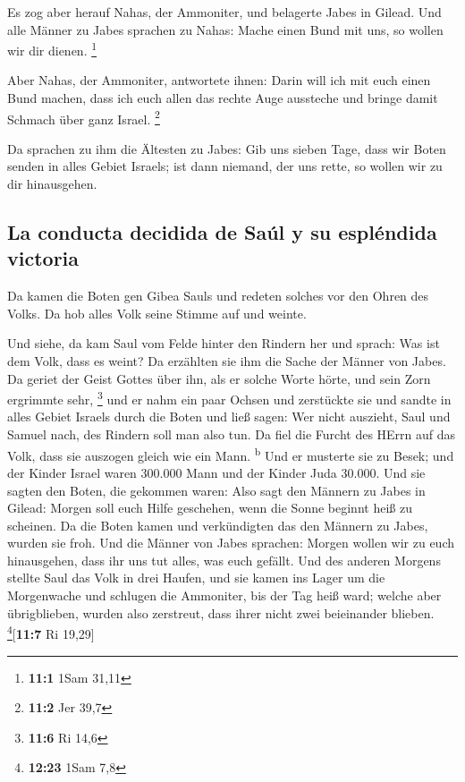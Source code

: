  Es zog aber herauf Nahas, der Ammoniter, und belagerte
Jabes in Gilead. Und alle Männer zu Jabes sprachen zu Nahas: Mache einen
Bund mit uns, so wollen wir dir dienen. \footnote{\textbf{11:1} 1Sam
  31,11}

 Aber Nahas, der Ammoniter, antwortete ihnen: Darin will
ich mit euch einen Bund machen, dass ich euch allen das rechte Auge
aussteche und bringe damit Schmach über ganz Israel. \footnote{\textbf{11:2}
  Jer 39,7}

 Da sprachen zu ihm die Ältesten zu Jabes: Gib uns sieben
Tage, dass wir Boten senden in alles Gebiet Israels; ist dann niemand,
der uns rette, so wollen wir zu dir hinausgehen.

\hypertarget{la-conducta-decidida-de-sauxfal-y-su-espluxe9ndida-victoria}{%
\subsection{La conducta decidida de Saúl y su espléndida
victoria}\label{la-conducta-decidida-de-sauxfal-y-su-espluxe9ndida-victoria}}

 Da kamen die Boten gen Gibea Sauls und redeten solches
vor den Ohren des Volks. Da hob alles Volk seine Stimme auf und weinte.

 Und siehe, da kam Saul vom Felde hinter den Rindern her
und sprach: Was ist dem Volk, dass es weint? Da erzählten sie ihm die
Sache der Männer von Jabes.  Da geriet der Geist Gottes
über ihn, als er solche Worte hörte, und sein Zorn ergrimmte sehr,
\footnote{\textbf{11:6} Ri 14,6}  und er nahm ein paar
Ochsen und zerstückte sie und sandte in alles Gebiet Israels durch die
Boten und ließ sagen: Wer nicht auszieht, Saul und Samuel nach, des
Rindern soll man also tun. Da fiel die Furcht des HErrn auf das Volk,
dass sie auszogen gleich wie ein Mann. \textsuperscript{b}
 Und er musterte sie zu Besek; und der Kinder Israel waren
300.000 Mann und der Kinder Juda 30.000.  Und sie sagten
den Boten, die gekommen waren: Also sagt den Männern zu Jabes in Gilead:
Morgen soll euch Hilfe geschehen, wenn die Sonne beginnt heiß zu
scheinen. Da die Boten kamen und verkündigten das den Männern zu Jabes,
wurden sie froh.  Und die Männer von Jabes sprachen:
Morgen wollen wir zu euch hinausgehen, dass ihr uns tut alles, was euch
gefällt.  Und des anderen Morgens stellte Saul das Volk
in drei Haufen, und sie kamen ins Lager um die Morgenwache und schlugen
die Ammoniter, bis der Tag heiß ward; welche aber übrigblieben, wurden
also zerstreut, dass ihrer nicht zwei beieinander blieben.
\footnote{\textbf{12:23} 1Sam 7,8}{[}\textbf{11:7} Ri 19,29{]}

